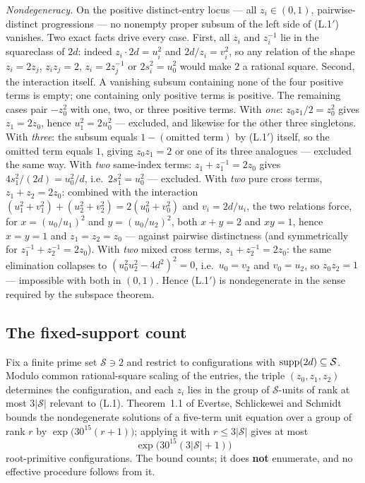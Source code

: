 \emph{Nondegeneracy.} On the positive distinct-entry locus --- all $z_i\in(0,1)$,
pairwise-distinct progressions --- no nonempty proper subsum of the left
side of (L.1$'$) vanishes. Two exact facts drive every case. First, all
$z_i$ and $z_i^{-1}$ lie in the squareclass of $2d$: indeed
$z_i\cdot 2d=u_i^{2}$ and $2d/z_i=v_i^{2}$, so any relation of the shape
$z_i=2z_j$, $z_iz_j=2$, $z_i=2z_j^{-1}$ or $2s_i^2=u_0^2$ would make $2$ a
rational square. Second, the interaction itself. A vanishing subsum
containing none of the four positive terms is empty; one containing only
positive terms is positive. The remaining cases pair $-z_0^{2}$ with one,
two, or three positive terms. With \emph{one}: $z_0z_1/2=z_0^{2}$ gives
$z_1=2z_0$, hence $u_1^{2}=2u_0^{2}$ --- excluded, and likewise for the
other three singletons. With \emph{three}: the subsum equals
$1-(\text{omitted term})$ by (L.1$'$) itself, so the omitted term equals
$1$, giving $z_0z_1=2$ or one of its three analogues --- excluded the same
way. With \emph{two} same-index terms:
$z_1+z_1^{-1}=2z_0$ gives $4s_1^{2}/(2d)=u_0^{2}/d$, i.e.\
$2s_1^{2}=u_0^{2}$ --- excluded. With \emph{two} pure cross terms,
$z_1+z_2=2z_0$: combined with the interaction
$(u_1^2+v_1^2)+(u_2^2+v_2^2)=2(u_0^2+v_0^2)$ and $v_i=2d/u_i$, the two
relations force, for $x=(u_0/u_1)^{2}$ and $y=(u_0/u_2)^{2}$, both
$x+y=2$ and $xy=1$, hence $x=y=1$ and $z_1=z_2=z_0$ --- against pairwise
distinctness (and symmetrically for $z_1^{-1}+z_2^{-1}=2z_0$). With
\emph{two} mixed cross terms, $z_1+z_2^{-1}=2z_0$: the same elimination
collapses to $(u_0^{2}u_2^{2}-4d^{2})^{2}=0$, i.e.\ $u_0=v_2$ and
$v_0=u_2$, so $z_0z_2=1$ --- impossible with both in $(0,1)$. Hence
(L.1$'$) is nondegenerate in the sense required by the subspace theorem.

\subsection{The fixed-support count}

Fix a finite prime set $\mathcal S\ni2$ and restrict to configurations with
$\operatorname{supp}(2d)\subseteq\mathcal S$. Modulo common rational-square scaling of the
entries, the triple $(z_0,z_1,z_2)$ determines the configuration, and each
$z_i$ lies in the group of $\mathcal S$-units of rank at most
$3|\mathcal S|$ relevant to (L.1). Theorem~1.1 of Evertse, Schlickewei and
Schmidt~\cite{ESS02} bounds the nondegenerate solutions of a five-term unit
equation over a group of rank $r$ by $\exp\bigl(30^{15}(r+1)\bigr)$;
applying it with $r\le3|\mathcal S|$ gives at most
\[
\exp\bigl(30^{15}(3|\mathcal S|+1)\bigr)
\]
root-primitive configurations. The bound counts; it does \textbf{not}
enumerate, and no effective procedure follows from it.

